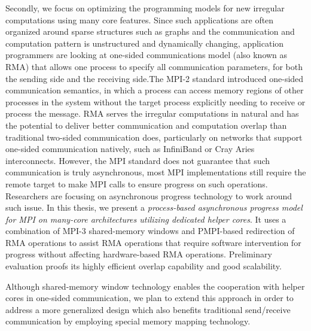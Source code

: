 Secondly, we focus on optimizing the programming models for new irregular 
computations using many core features. Since such applications are often 
organized around sparse structures such as graphs and the communication 
and computation pattern is unstructured and dynamically changing, application 
programmers are looking at one-sided communications model (also known as 
RMA) that allows one process to specify all communication parameters, 
for both the sending side and the receiving side.The MPI-2 standard 
introduced one-sided communication semantics, in which a process can access 
memory regions of other processes in the system without the target process 
explicitly needing to receive or process the message. RMA serves the 
irregular computations in natural and has the potential to deliver better 
communication and computation overlap than traditional two-sided communication 
does, particularly on networks that support one-sided communication natively, 
such as InfiniBand or Cray Aries interconnects. However, the MPI standard 
does not guarantee that such communication is truly asynchronous, most 
MPI implementations still require the remote target to make MPI calls to 
ensure progress on such operations. Researchers are focusing on asynchronous 
progress technology to work around such issue. In this thesis, we present 
a \textit{process-based asynchronous progress model for MPI on many-core 
architectures utilizing dedicated helper cores}. It uses a combination 
of MPI-3 shared-memory windows and PMPI-based redirection of RMA operations 
to assist RMA operations that require software intervention for progress 
without affecting hardware-based RMA operations. Preliminary evaluation 
proofs its highly efficient overlap capability and good scalability.

Although shared-memory window technology enables the cooperation with 
helper cores in one-sided communication, we plan to extend this approach 
in order to address a more generalized design which also benefits 
traditional send\slash receive communication by employing special memory 
mapping technology.

\clearpage

